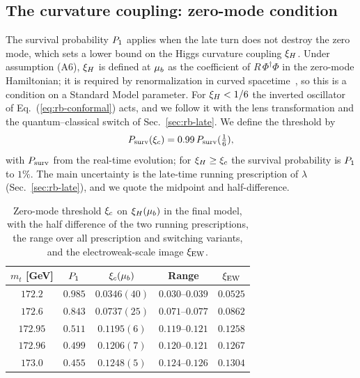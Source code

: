 \subsection{The curvature coupling: zero-mode condition}
\label{sec:rb-xic}

The survival probability $P_1$ applies when the late turn does not destroy the zero mode, which sets a lower bound on the Higgs curvature coupling $\xi_H$.
Under assumption (A6), $\xi_H$ is defined at $\mu_b$ as the coefficient of $R\,\Phi^\dagger\Phi$ in the zero-mode Hamiltonian; it is required by renormalization in curved spacetime~\cite{Birrell:1982ix}, so this is a condition on a Standard Model parameter.
For $\xi_H<1/6$ the inverted oscillator of Eq.~(\ref{eq:rb-conformal}) acts, and we follow it with the lens transformation and the quantum--classical switch of Sec.~\ref{sec:rb-late}.
We define the threshold by
\begin{equation}
P_{\rm surv}(\xic)=0.99\,P_{\rm surv}(\tfrac16), %
\label{eq:rb-xic}
\end{equation}
with $P_{\rm surv}$ from the real-time evolution; for $\xi_H\ge\xi_c$ the survival probability is $P_1$ to $1\%$.
The main uncertainty is the late-time running prescription of $\lambda$ (Sec.~\ref{sec:rb-late}), and we quote the midpoint and half-difference.

\begin{table}[t]
\centering
\caption{Zero-mode threshold $\xi_c$ on $\xi_H(\mu_b)$ in the final model, with the half difference of the two running prescriptions, the range over all prescription and switching variants, and the electroweak-scale image $\xi_{\rm EW}$.} %
\label{tab:rb-xic}
\begin{tabular}{ccccc}
\toprule
$m_t$ [GeV] & $P_1$ & $\xi_c(\mu_b)$ & Range & $\xi_{\rm EW}$ \\
\midrule
$172.2$ & $0.985$ & $0.0346(40)$ & $0.030$--$0.039$ & $0.0525$ \\ %
$172.6$ & $0.843$ & $0.0737(25)$ & $0.071$--$0.077$ & $0.0862$ \\ %
$172.95$ & $0.511$ & $0.1195(6)$ & $0.119$--$0.121$ & $0.1258$ \\ %
$172.96$ & $0.499$ & $0.1206(7)$ & $0.120$--$0.121$ & $0.1267$ \\ %
$173.0$ & $0.455$ & $0.1248(5)$ & $0.124$--$0.126$ & $0.1304$ \\ %
\bottomrule
\end{tabular}
\end{table}

